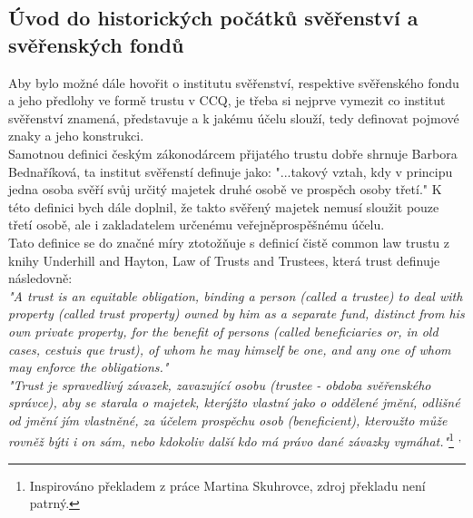 \documentclass{article}
\begin{document}
\newpage

\subsection{Úvod do historických počátků svěřenství a\\ svěřenských fondů}

\indent Aby bylo možné dále hovořit o institutu svěřenství, respektive svěřenského fondu a jeho předlohy ve formě trustu v CCQ, je třeba si nejprve vymezit co institut svěřenství znamená, představuje a k jakému účelu slouží, tedy definovat pojmové znaky a jeho konstrukci.\\

Samotnou definici českým zákonodárcem přijatého trustu dobře shrnuje Bar\-bora Bednaříková, ta institut svěřenstí definuje jako: "...takový vztah, kdy v principu jedna osoba svěří svůj určitý majetek druhé osobě ve prospěch osoby třetí." K této definici bych dále doplnil, že takto svěřený majetek nemusí sloužit pouze třetí osobě, ale i zakladatelem určenému veřejněprospěšnému účelu.\\

Tato definice se do značné míry ztotožňuje s definicí čistě common law trustu z knihy Underhill and Hayton, Law of Trusts and Trustees, která trust definuje následovně:\\ %

\textit{"A trust is an equitable obligation, binding a person (called a trustee) to deal with property (called trust property) owned by him as a separate fund, distinct from his own private property, for the benefit of persons (called beneficiaries or, in old cases, cestuis que trust), of whom he may himself be one, and any one of whom may enforce the obligations."} \\

\textit{"Trust je spravedlivý závazek, zavazující osobu (trustee - obdoba svěřenského správce), aby se starala o majetek, kterýžto vlastní jako o oddělené jmění, odlišné od jmění jím vlastněné, za účelem prospěchu osob (beneficient), kteroužto může rovněž býti i on sám, nebo kdokoliv další kdo má právo dané závazky vymáhat."}\footnote{Inspirováno překladem z práce Martina Skuhrovce, zdroj překladu není patrný.} \textsuperscript{,}   \\
\end{document}
